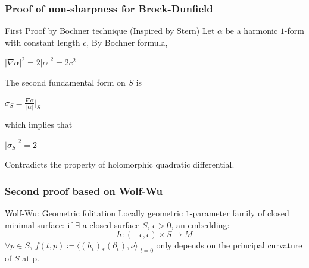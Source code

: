 \documentclass[t]{beamer}
\newcommand{\ds}{\displaystyle}
\begin{document}

\begin{frame}[t]
	\frametitle{Proof of non-sharpness for Brock-Dunfield}
	\begin{block}{First Proof by Bochner technique (Inspired by Stern)}
		Let $\alpha$ be a harmonic $1$-form with constant length $c$, By Bochner formula, 
		\begin{center}
			$ | \nabla \alpha |^2=2|\alpha|^2=2c^2$
		\end{center}
		The second fundamental form on $S$ is 
		\begin{center}
			$\ds \sigma_S =\frac{\nabla \alpha}{|\alpha|} \Big\vert_S  $
		\end{center}
		which implies that 
		\begin{center}
			$\ds |\sigma_S|^2=2 $
		\end{center} 
		Contradicts the property of holomorphic quadratic differential. 	
	\end{block}
	
\end{frame}

\begin{frame}[t]
	\frametitle{Second proof based on Wolf-Wu}
	\begin{block}{Wolf-Wu: Geometric folitation}
		Locally geometric $1$-parameter family of closed minimal surface: if $\exists$ a closed surface $S$, $\epsilon >0$, an embedding: 
		\begin{equation}
			h: (-\epsilon, \epsilon) \times S \rightarrow M
		\end{equation}
		$\forall p\in S$, $f(t, p)\coloneqq \langle (h_t)_*(\partial_t), \nu \rangle |_{t=0}$ only depends on the principal curvature of $S$ at p.
		
	\end{block}
\end{frame}
\end{document}
